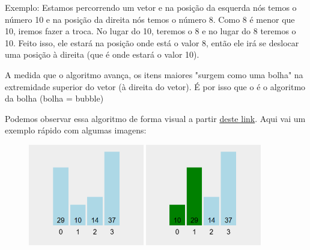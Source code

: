 \documentclass{report}
\begin{document}
	
	Exemplo: Estamos percorrendo um vetor e na posição da esquerda nós temos o número 10 e na posição da direita nós temos o número 8. Como 8 é menor que 10, iremos fazer a troca. No lugar do 10, teremos o 8 e no lugar do 8 teremos o 10. Feito isso, ele estará na posição onde está o valor 8, então ele irá se deslocar uma posição à direita (que é onde estará o valor 10).
	
	A medida que o algoritmo avança, os itens maiores "surgem como uma bolha" na extremidade superior do vetor (à direita do vetor). É por isso que o é o  algoritmo da bolha (bolha = bubble)
	
	Podemos observar essa algoritmo de forma visual a partir \href{ https://visualgo.net/en/sorting}{deste link}. Aqui vai um exemplo rápido com algumas imagens:


	\begin{figure}[h]
		\centering
		\includegraphics[width=0.45\textwidth]{imagens/bubble-sort1.png}
		\hfill
		\includegraphics[width=0.45\textwidth]{imagens/bubble-sort2.png}

	\end{figure}
	
\end{document}
